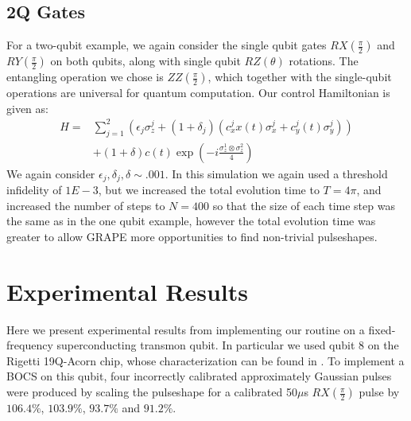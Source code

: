 \documentclass[aps,nofootinbib,pra,notitlepage,twocolumn]{revtex4-1}
\begin{document}
\subsection{2Q Gates}\label{2Q Gates}
 For a two-qubit example, we again consider the single qubit gates $RX(\frac{\pi}{2})$ and $RY(\frac{\pi}{2})$ on both qubits, along with single qubit $RZ(\theta)$ rotations. The entangling operation we chose is $ZZ(\frac{\pi}{2})$, which together with the single-qubit operations are universal for quantum computation. Our control Hamiltonian is given as:
\begin{equation} \label{eq:2Qham}
\begin{split}
H = &\sum_{j=1}^2(\epsilon_j\sigma_z^j + (1 + \delta_j)(c_x^jx(t)\sigma_x^j + c_y^j(t)\sigma_y^j)) \\
&+ (1+\delta)c(t) \exp{(-i\frac{\sigma_z^1\otimes\sigma_z^2}{4})}
\end{split}
\end{equation}
We again consider $\epsilon_j, \delta_j, \delta \sim .001$. In this simulation we again used a threshold infidelity of $1E-3$, but we increased the total evolution time to $T=4\pi$, and increased the number of steps to $N=400$ so that the size of each time step was the same as in the one qubit example, however the total evolution time was greater to allow GRAPE more opportunities to find non-trivial pulseshapes.

\section{Experimental Results}\label{experimental}
Here we present experimental results from implementing our routine on a fixed-frequency superconducting transmon qubit. In particular we used qubit 8 on the Rigetti 19Q-Acorn chip, whose characterization can be found in \cite{1712.05771}. To implement a BOCS on this qubit, four incorrectly calibrated approximately Gaussian pulses were produced by scaling the pulseshape for a calibrated 50$\mu$s $RX(\frac{\pi}{2})$ pulse by $106.4\%$,  $103.9\%$, $93.7\%$ and $91.2\%$.
\end{document}
